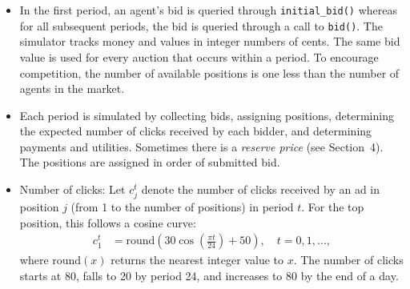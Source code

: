 \documentclass[11pt]{article}
\begin{document}
\begin{description}
\begin{itemize}
				\item In the first period, an agent's
                                  bid is queried through
                                  \verb+initial_bid()+ whereas for all
                                  subsequent periods, the bid is
                                  queried through a call to
                                  \verb+bid()+. The simulator tracks
                                  money and values in integer numbers
                                  of cents.
The same bid value is used for every auction that
occurs within a period. 
To encourage competition, the number of available positions is one less than
the number of agents in the market.
%
%
\item Each period is simulated by collecting bids, assigning positions,
  determining the expected number of clicks received by each bidder,
  and determining payments and utilities.  Sometimes there is a {\em
    reserve price} (see Section~4). The positions are assigned
in order of submitted bid. 
%
\item Number of clicks: Let $c_j^t$ denote the number of clicks
  received by an ad in position $j$ (from 1 to the number of
  positions) in period $t$. For the top position, this
  follows a cosine curve:
%
\begin{align}
 c_1^t &= \mbox{round}(30 \cos(\frac{\pi t}{24}) + 50),
\quad t = 0, 1, \ldots,
\end{align}
%
where $\mbox{round}(x)$ returns the nearest integer value to $x$. 
The number of clicks starts at 80, falls to 20 by period 24,
and  increases  to 80 by the end of a day.


\end{itemize}
\end{description}
\end{document}

